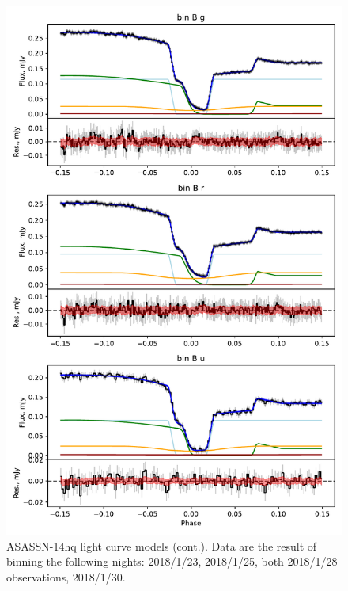 \begin{figure}
    \centering
    \includegraphics[width=\textwidth]{figures/results/ASASSN-14hq/ASASSN-14hq_2.pdf}
    \caption{ASASSN-14hq light curve models (cont.). Data are the result of binning the following nights: 2018/1/23, 2018/1/25, both 2018/1/28 observations, 2018/1/30.}
    \label{fig:ASASSN-14hq all light curves cont}
\end{figure}
